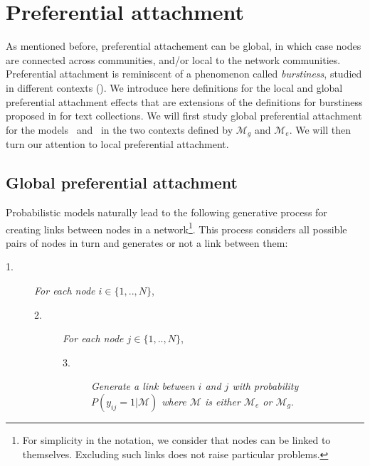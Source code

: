 \section{Preferential attachment}
\label{sec:burstiness}

As mentioned before, preferential attachement can be global, in which case nodes are connected across communities, and/or local to the network communities. Preferential attachment is reminiscent of a phenomenon called \textit{burstiness}, studied in different contexts (\cite{barabasi_burst}). We introduce here definitions for the local and global preferential attachment effects that are extensions of the definitions for burstiness proposed in \cite{clinchant2010information} for text collections. We will first study global preferential attachment for the models \ifm\ and \imb\ in the two contexts defined by $\mathcal{M}_g$ and $\mathcal{M}_e$. We will then turn our attention to local preferential attachment.

\subsection{Global preferential attachment}

Probabilistic models naturally lead to the following generative process for creating links between nodes in a network\footnote{For simplicity in the notation, we consider that nodes can be linked to themselves. Excluding such links does not raise particular problems.}. This process considers all possible pairs of nodes in turn and generates or not a link between them:

\begin{description}
 \item[1.] \textit{For each node $i \in \{1, .., N\}$},
 \begin{description}
    \item[2.] \textit{For each node $j \in \{1, .., N\}$},
       \begin{description}
          \item[3.] \textit{Generate a link between $i$ and $j$ with probability $P(y_{ij}=1 | \mathcal{M})$ where $\mathcal{M}$ is either $\mathcal{M}_e$ or $\mathcal{M}_g$}.
       \end{description}
  \end{description}
\end{description}

